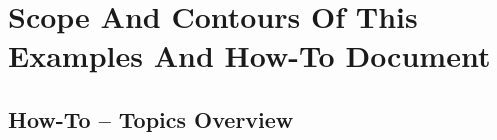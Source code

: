 \begin{comment}
*  [[elisp:(org-cycle)][| ]] [[elisp:(org-show-subtree)][|=]] [[elisp:(show-children 10)][|V]] [[elisp:(bx:orgm:indirectBufOther)][|>]] [[elisp:(bx:orgm:indirectBufMain)][|I]] [[elisp:(blee:ppmm:org-mode-toggle)][|N]] [[elisp:(org-top-overview)][|O]] [[elisp:(progn (org-shifttab) (org-content))][|C]] [[elisp:(delete-other-windows)][|1]]  /Section/   Scope And Contours Of This Examples And How-To Document ::  [[elisp:(org-cycle)][| ]]
\end{comment}

\section{Scope And Contours Of This Examples And How-To Document}

\begin{comment}
**  [[elisp:(org-cycle)][| ]] [[elisp:(org-show-subtree)][|=]] [[elisp:(show-children 10)][|V]] [[elisp:(bx:orgm:indirectBufOther)][|>]] [[elisp:(bx:orgm:indirectBufMain)][|I]] [[elisp:(blee:ppmm:org-mode-toggle)][|N]] [[elisp:(org-top-overview)][|O]] [[elisp:(progn (org-shifttab) (org-content))][|C]] [[elisp:(delete-other-windows)][|1]]  /Subsection/   How-To -- Topics Overview ::  [[elisp:(org-cycle)][| ]]
\end{comment}

\subsection{How-To -- Topics Overview}


\begin{comment}
*****  [[elisp:(org-cycle)][| ]]  [[elisp:(blee:ppmm:org-mode-toggle)][Nat]] [[elisp:(beginning-of-buffer)][Top]] [[elisp:(delete-other-windows)][(1)]] || /Frame/ *Label=How-To--TopicsOverview*  How-To -- Topics Overview ::  [[elisp:(org-cycle)][| ]]
\end{comment}

